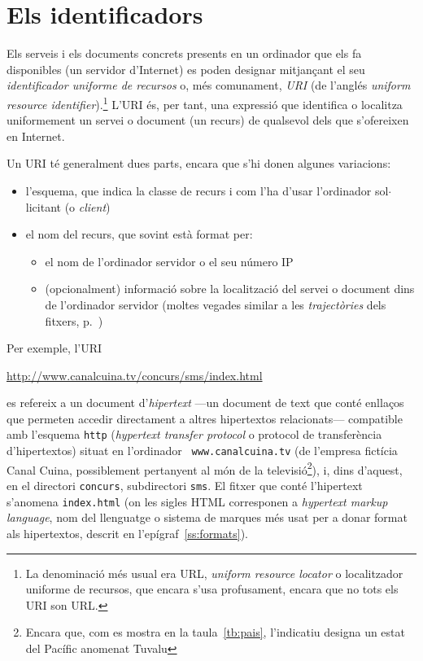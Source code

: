 \section{Els identificadors}

Els serveis i els documents concrets presents en un ordinador que els
fa disponibles (un servidor d'Internet) es poden designar mitjançant
el seu \emph{identificador uniforme de recursos} o, més comunament,
\emph{URI} (de l'anglés \emph{uniform resource
  identifier}).\footnote{La denominació més usual era URL,
  \emph{uniform resource locator} o localitzador uniforme de recursos,
  que encara s'usa profusament, encara que no tots els URI son URL.}
L'URI és, per tant, una expressió que identifica o localitza
uniformement un servei o document (un recurs) de qualsevol dels que
s'ofereixen en Internet.

Un URI té generalment dues parts, encara que s'hi donen algunes
variacions:
\begin{itemize}
\item l'esquema, que indica la classe de recurs i com l'ha d'usar
      l'ordinador sol$\cdot$licitant (o \emph{client})
\item el nom del recurs, que sovint està format per:
  \begin{itemize}
  \item el nom de l'ordinador servidor o el seu número IP
  \item (opcionalment) informació sobre la localització del
    servei o document dins de l'ordinador servidor (moltes vegades
    similar a les \emph{trajectòries} dels fitxers, p.~\pageref{pg:fitxer})
  \end{itemize}
\end{itemize}
Per exemple, l'URI
\begin{center}
\url{http://www.canalcuina.tv/concurs/sms/index.html}
\end{center}
es refereix a un document d'\emph{hipertext} ---un
  document de text que conté enllaços que permeten accedir
  directament a altres hipertextos relacionats--- compatible amb 
l'esquema {\tt http} (\emph{hypertext transfer protocol} o protocol de
transferència d'hipertextos) situat en l'ordinador {\tt
  www.canalcuina.tv} (de l'empresa fictícia Canal Cuina,
  possiblement pertanyent al món de la televisió\footnote{Encara que,
  com es mostra en la taula~\ref{tb:pais}, l'indicatiu designa un estat
  del Pacífic anomenat Tuvalu}), i, dins d'aquest, 
  en el directori {\tt concurs},
subdirectori {\tt sms}. El fitxer que conté l'hipertext s'anomena
{\tt index.html} (on les sigles HTML corresponen a \emph{hypertext
  markup language}, nom del llenguatge o sistema de marques més usat
per a donar format als hipertextos, descrit en
l'epígraf~\ref{ss:formats}).


